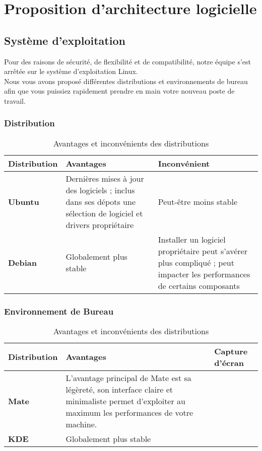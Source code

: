 \chapter{Proposition d'architecture logicielle}

\section{Système d'exploitation}

Pour des raisons de sécurité, de flexibilité et de compatibilité, notre équipe s’est arrêtée sur le système d’exploitation Linux. \\

Nous vous avons proposé différentes distributions et environnements de bureau afin que vous puissiez rapidement prendre en main votre nouveau poste de travail.


\subsection{Distribution}

\begin{table}[ht]
	\centering
	\begin{tabularx}{\textwidth}{|C|X|X|}
		\hline
		\textbf{Distribution} & \textbf{Avantages} & \textbf{Inconvénient} \\
		\hline
		\textbf{Ubuntu} & Dernières mises à jour des logiciels ; inclus dans ses dépots une sélection de logiciel et drivers propriétaire & Peut-être moins stable\\
		\hline
		\textbf{Debian} & Globalement plus stable & Installer un logiciel propriétaire peut s'avérer plus compliqué ; peut impacter les performances de certains composants \\
		\hline
	\end{tabularx}
	\caption{Avantages et inconvénients des distributions}
	\label{tab:exemple}
\end{table}

\subsection{Environnement de Bureau}

\begin{table}[ht]
	\centering
	\begin{tabularx}{\textwidth}{|C|X|X|}
		\hline
		\textbf{Distribution} & \textbf{Avantages} & \textbf{Capture d'écran} \\
		\hline
		\textbf{Mate} & L'avantage principal de Mate est sa légèreté, son interface claire et minimaliste permet d'exploiter au maximum les performances de votre machine. & \\
		\hline
		\textbf{KDE} & Globalement plus stable & \\
		\hline
	\end{tabularx}
	\caption{Avantages et inconvénients des distributions}
	\label{tab:exemple}
\end{table}


